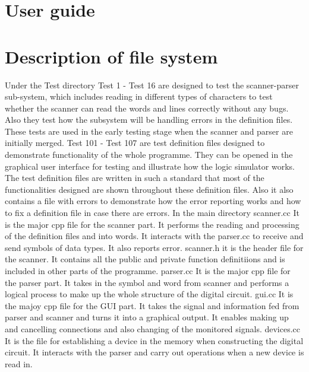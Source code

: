 \documentclass[12pt]{article}
\begin{document}
\section{User guide}

\newpage
\section{Description of file system}
Under the Test directory
Test 1 - Test 16 are designed to test the scanner-parser sub-system, which includes reading in different types of characters 
to test whether the scanner can read the words and lines correctly without any bugs. Also they test how the subsystem will be 
handling errors in the definition files. These tests are used in the early testing stage when the scanner and parser are 
initially merged.
Test 101 - Test 107 are test definition files designed to demonstrate functionality of the whole programme. They can be opened 
in the graphical user interface for testing and illustrate how the logic simulator works. The test definition files are written
 in such a standard that most of the functionalities designed are shown throughout these definition files. Also it also contains
 a file with errors to demonstrate how the error reporting works and how to fix a definition file in case there are errors.
In the main directory 
scanner.cc It is the major cpp file for the scanner part. It performs the reading and processing of the definition files and into
 words. It interacts with the parser.cc to receive and send symbols of data types. It also reports error.
scanner.h it is the header file for the scanner. It contains all the public and private function definitiions and is included in 
other parts of the programme.
parser.cc It is the major cpp file for the parser part. It takes in the symbol and word from scanner and performs a logical process
to make up the whole structure of the digital circuit.
gui.cc It is the majoy cpp file for the GUI part. It takes the signal and information fed from parser and scanner and turns it into 
a graphical output. It enables making up and cancelling connections and also changing of the monitored signals.
devices.cc It is the file for establishing a device in the memory when constructing the digital circuit. It interacts with the parser
and carry out operations when a new device is read in.
\end{document}
